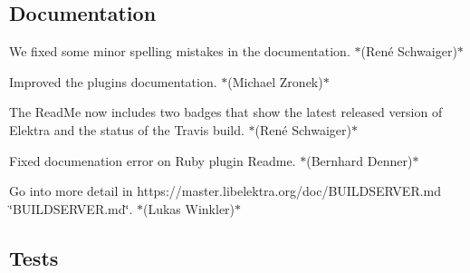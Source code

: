 \subsection*{Documentation}


\begin{DoxyItemize}
\item We fixed some minor spelling mistakes in the documentation. $\ast$(René Schwaiger)$\ast$
\item Improved the plugins documentation. $\ast$(Michael Zronek)$\ast$
\item The Read\+Me now includes two badges that show the latest released version of Elektra and the status of the Travis build. $\ast$(René Schwaiger)$\ast$
\item Fixed documenation error on Ruby plugin Readme. $\ast$(Bernhard Denner)$\ast$
\item Go into more detail in https\+://master.libelektra.\+org/doc/\+B\+U\+I\+L\+D\+S\+E\+R\+V\+ER.md \char`\"{}\+B\+U\+I\+L\+D\+S\+E\+R\+V\+E\+R.\+md\char`\"{}. $\ast$(Lukas Winkler)$\ast$
\end{DoxyItemize}

\subsection*{Tests}



